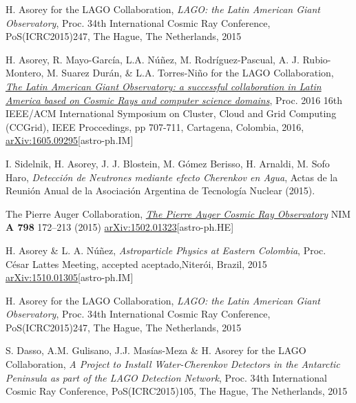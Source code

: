 \begin{etaremune}
\item {}H. Asorey for the LAGO Collaboration, {\emph{LAGO: the Latin American Giant Observatory}}, \en Proc. 34th International Cosmic Ray Conference, PoS(ICRC2015)247, The Hague, The Netherlands, 2015

\item {} H. Asorey, R. Mayo-García, L.A. Núñez, M. Rodríguez-Pascual, A. J. Rubio-Montero, M. Suarez Durán, \& L.A. Torres-Niño for the LAGO Collaboration, {\emph{\href{http://dx.doi.org/10.1109/CCGrid.2016.110}{The Latin American Giant Observatory: a successful collaboration in Latin America based on Cosmic Rays and computer science domains}}}, \en Proc. 2016 16th IEEE/ACM International Symposium on Cluster, Cloud and Grid Computing (CCGrid), IEEE Proccedings, pp 707-711, Cartagena, Colombia, 2016, \href{http://arxiv.org/abs/1605.09295}{arXiv:1605.09295}[astro-ph.IM]

\item {} I. Sidelnik, H. Asorey, J. J. Blostein, M. Gómez Berisso, H. Arnaldi, M. Sofo Haro, {\emph{Detección de Neutrones mediante efecto Cherenkov en Agua}}, Actas de la Reunión Anual de la Asociación Argentina de Tecnología Nuclear (2015).

\item {}The Pierre Auger Collaboration, \href{http://dx.doi.org/10.1016/j.nima.2015.06.058}{\emph{The Pierre Auger Cosmic Ray Observatory}} NIM {\bf{A 798}} 172--213 (2015) \href{http://arxiv.org/abs/1502.01323}{arXiv:1502.01323}[astro-ph.HE]

\item {}H. Asorey \& L. A. Núñez, {\emph{Astroparticle Physics at Eastern Colombia}}, \en Proc. César Lattes Meeting, \ifeng accepted \else aceptado,\fi Niterói, Brazil, 2015 \href{http://arxiv.org/abs/1510.01305}{arXiv:1510.01305}[astro-ph.IM]

\item {}H. Asorey for the LAGO Collaboration, {\emph{LAGO: the Latin American Giant Observatory}}, \en Proc. 34th International Cosmic Ray Conference, PoS(ICRC2015)247, The Hague, The Netherlands, 2015

\item {}S. Dasso, A.M. Gulisano, J.J. Masías-Meza \& H. Asorey for the LAGO Collaboration, {\emph{A Project to Install Water-Cherenkov Detectors in the Antarctic Peninsula as part of the LAGO Detection Network}}, \en Proc. 34th International Cosmic Ray Conference, PoS(ICRC2015)105, The Hague, The Netherlands, 2015


\end{etaremune}
